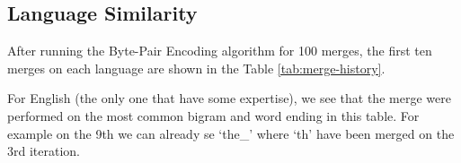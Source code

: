 \subsection{Language Similarity}
After running the Byte-Pair Encoding algorithm for 100 merges, the first ten merges on each language are shown in the Table \ref{tab:merge-history}.
\begin{table}[H]
	\centering
		\caption{Ten first merge on each language}
	\label{tab:merge-history}
\end{table}
For English (the only one that have some expertise), we see that the merge were performed on the most common bigram and word ending in this table. For example on the 9th we can already se `the\_' where `th' have been merged on the 3rd iteration.



